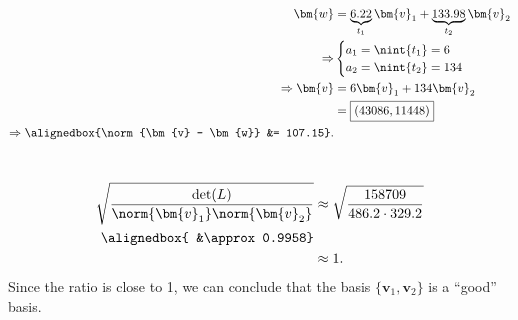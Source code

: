 \documentclass[
  coursecode={MTHE 418},
  assignmentname={Homework \homeworknumber},
  studentnumber=20053722,
  name={Bryan Hoang},
  draft,
]{
  ltxanswer%
}
\begin{document}
  \begin{questions}
    \setcounter{question}{\questionnumber}
    \addtocounter{question}{-1}
    \question[10]\
    \begin{parts}
      \part{}
      \begin{solution}
        \begin{align*}
          \bm{w}                                         &= \underbrace{6.22}_{t_{1}} \bm{v}_{1} + \underbrace{133.98}_{t_{2}} \bm{v}_{2} \\
          \Rightarrow                                    &\begin{cases}
                                                            a_{1} = \nint{t_{1}} = 6 \\
                                                            a_{2} = \nint{t_{2}} = 134
                                                          \end{cases}                               \\
          \Rightarrow \bm{v}                             &= 6 \bm{v}_{1} + 134 \bm{v}_{2}                                                 \\
                                                         &= \boxed{(43086, 11448)}                                                        \\
          \Rightarrow \alignedbox{\norm{\bm{v} - \bm{w}} &= 107.15}.
        \end{align*}
      \end{solution}

      \part{}
      \begin{solution}
        \begin{align*}
          \sqrt{\frac{\det(L)}{\norm{\bm{v}_{1}} \norm{\bm{v}_{2}}}} &\approx \sqrt{\frac{158709}{486.2 \cdot 329.2}} \\
          \alignedbox{                                               &\approx 0.9958}                                 \\
                                                                     &\approx 1.
        \end{align*}
        Since the ratio is close to 1, we can conclude that the basis \(\{\bm{v}_{1}, \bm{v}_{2}\}\) is a ``good'' basis.
      \end{solution}


\end{parts}
\end{questions}
\end{document}
